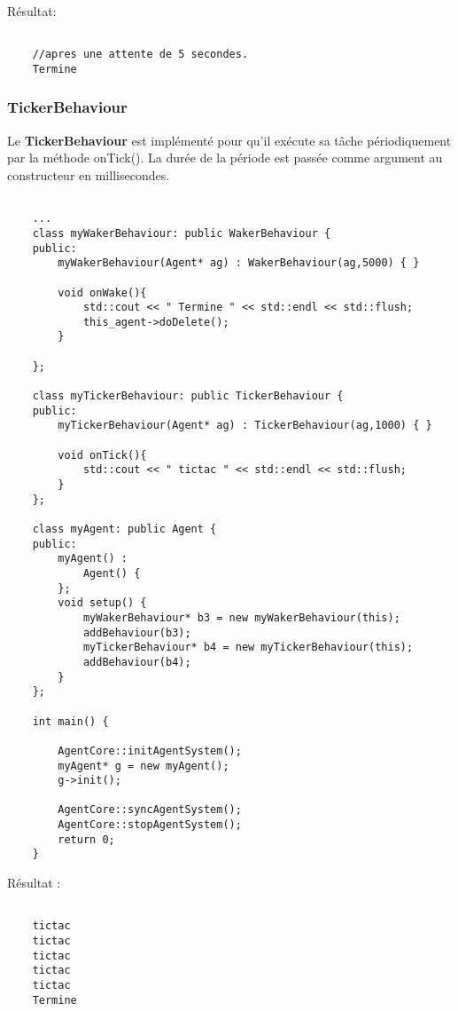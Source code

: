 Résultat:

\begin{lstlisting}[backgroundcolor=\color{green!5}]
	
	//apres une attente de 5 secondes.
	Termine

\end{lstlisting}

\subsubsection{TickerBehaviour}

Le \textbf{TickerBehaviour} est implémenté pour qu'il exécute sa tâche périodiquement par la méthode onTick(). La durée de la période est passée comme argument au constructeur en millisecondes. 

\begin{lstlisting}

	...
	class myWakerBehaviour: public WakerBehaviour {
	public:
		myWakerBehaviour(Agent* ag) : WakerBehaviour(ag,5000) { }

		void onWake(){
			std::cout << " Termine " << std::endl << std::flush;
			this_agent->doDelete();
		}

	};

	class myTickerBehaviour: public TickerBehaviour {
	public:
		myTickerBehaviour(Agent* ag) : TickerBehaviour(ag,1000) { }

		void onTick(){
			std::cout << " tictac " << std::endl << std::flush;
		}
	};
	
	class myAgent: public Agent {
	public:
		myAgent() :
			Agent() {
		};
		void setup() {
			myWakerBehaviour* b3 = new myWakerBehaviour(this);
			addBehaviour(b3);
			myTickerBehaviour* b4 = new myTickerBehaviour(this);
			addBehaviour(b4);
		}
	};

	int main() {

		AgentCore::initAgentSystem();
		myAgent* g = new myAgent();
		g->init();

		AgentCore::syncAgentSystem();
		AgentCore::stopAgentSystem();
		return 0;
	}

\end{lstlisting}

Résultat : 

\begin{lstlisting}[backgroundcolor=\color{green!5}]
	
	tictac 
	tictac 
	tictac 
	tictac 
	tictac 
	Termine

\end{lstlisting}

